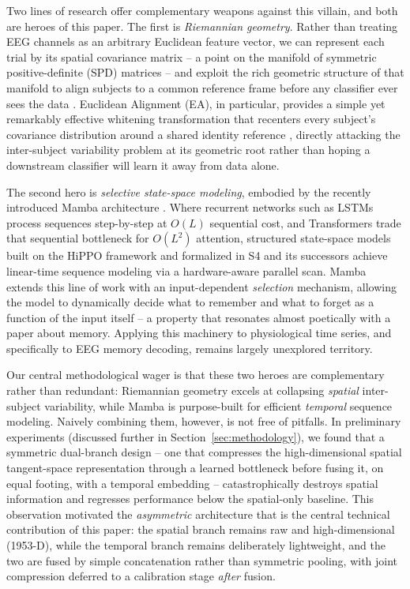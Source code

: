 \documentclass[journal]{IEEEtran}
\begin{document}
Two lines of research offer complementary weapons against this villain, and both are heroes of this paper. The first is \emph{Riemannian geometry}. Rather than treating EEG channels as an arbitrary Euclidean feature vector, we can represent each trial by its spatial covariance matrix -- a point on the manifold of symmetric positive-definite (SPD) matrices -- and exploit the rich geometric structure of that manifold to align subjects to a common reference frame before any classifier ever sees the data \cite{barachant2012multiclass,congedo2017riemannian,yger2017review}. Euclidean Alignment (EA), in particular, provides a simple yet remarkably effective whitening transformation that recenters every subject's covariance distribution around a shared identity reference \cite{he2020transfer,zanini2018transfer}, directly attacking the inter-subject variability problem at its geometric root rather than hoping a downstream classifier will learn it away from data alone.

The second hero is \emph{selective state-space modeling}, embodied by the recently introduced Mamba architecture \cite{gu2023mamba}. Where recurrent networks such as LSTMs \cite{hochreiter1997long} process sequences step-by-step at $O(L)$ sequential cost, and Transformers \cite{vaswani2017attention} trade that sequential bottleneck for $O(L^2)$ attention, structured state-space models built on the HiPPO framework \cite{gu2020hippo} and formalized in S4 \cite{gu2022efficiently} and its successors \cite{smith2023simplified,poli2023hyena,tay2021long} achieve linear-time sequence modeling via a hardware-aware parallel scan. Mamba extends this line of work with an input-dependent \emph{selection} mechanism, allowing the model to dynamically decide what to remember and what to forget as a function of the input itself -- a property that resonates almost poetically with a paper about memory. Applying this machinery to physiological time series, and specifically to EEG memory decoding, remains largely unexplored territory.

Our central methodological wager is that these two heroes are complementary rather than redundant: Riemannian geometry excels at collapsing \emph{spatial} inter-subject variability, while Mamba is purpose-built for efficient \emph{temporal} sequence modeling. Naively combining them, however, is not free of pitfalls. In preliminary experiments (discussed further in Section~\ref{sec:methodology}), we found that a symmetric dual-branch design -- one that compresses the high-dimensional spatial tangent-space representation through a learned bottleneck before fusing it, on equal footing, with a temporal embedding -- catastrophically destroys spatial information and regresses performance below the spatial-only baseline. This observation motivated the \emph{asymmetric} architecture that is the central technical contribution of this paper: the spatial branch remains raw and high-dimensional (1953-D), while the temporal branch remains deliberately lightweight, and the two are fused by simple concatenation rather than symmetric pooling, with joint compression deferred to a calibration stage \emph{after} fusion.
\end{document}
